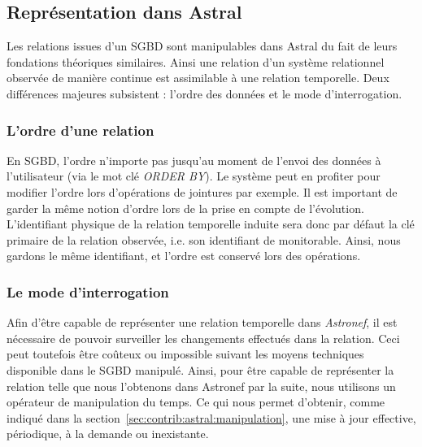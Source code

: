 \subsection{Représentation dans Astral}\label{sec:contrib:asteroid:theorie:astral}
Les relations issues d'un SGBD sont manipulables dans Astral du fait de leurs fondations théoriques similaires. Ainsi une relation d'un système relationnel observée de manière continue est assimilable à une relation temporelle. Deux différences majeures subsistent : l'ordre des données et le mode d'interrogation.
\subsubsection{L'ordre d'une relation}
En SGBD, l'ordre n'importe pas jusqu'au moment de l'envoi des données à l'utilisateur (via le mot clé \textit{ORDER BY}). Le système peut en profiter pour modifier l'ordre lors d'opérations de jointures par exemple. Il est important de garder la même notion d'ordre lors de la prise en compte de l'évolution. L'identifiant physique de la relation temporelle induite sera donc par défaut la clé primaire de la relation observée, i.e. son identifiant de monitorable. Ainsi, nous gardons le même identifiant, et l'ordre est conservé lors des opérations.

\subsubsection{Le mode d'interrogation}
Afin d'être capable de représenter une relation temporelle dans \textit{Astronef}, il est nécessaire de pouvoir surveiller les changements effectués dans la relation. Ceci peut toutefois être coûteux ou impossible suivant les moyens techniques disponible dans le SGBD manipulé. Ainsi, pour être capable de représenter la relation telle que nous l'obtenons dans Astronef par la suite, nous utilisons un opérateur de manipulation du temps. Ce qui nous permet d'obtenir, comme indiqué dans la section~\ref{sec:contrib:astral:manipulation}, une mise à jour effective, périodique, à la demande ou inexistante.